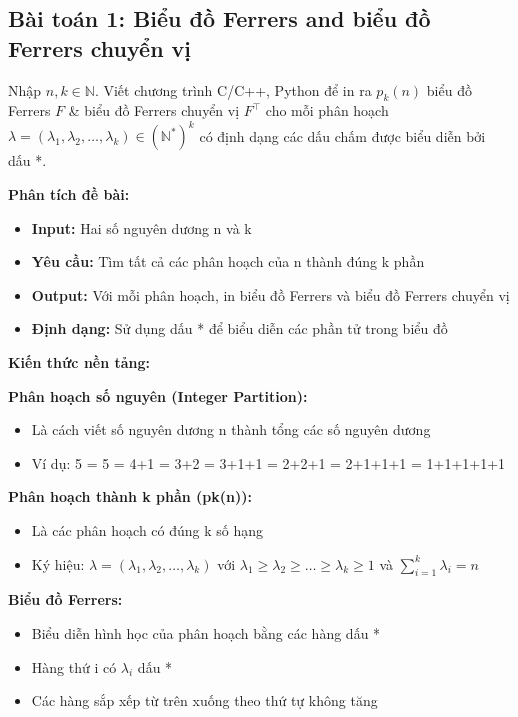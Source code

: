 \documentclass[12pt,a4paper]{article}
\begin{document}
\subsection{Bài toán 1: Biểu đồ Ferrers and biểu đồ Ferrers chuyển vị}

\begin{problembox}
Nhập $n, k \in \mathbb{N}$. Viết chương trình C/C++, Python để in ra $p_k(n)$ biểu đồ Ferrers $F$ \& biểu đồ Ferrers chuyển vị $F^\top$ cho mỗi phân hoạch $\lambda = (\lambda_1, \lambda_2, \ldots, \lambda_k) \in (\mathbb{N}^*)^k$ có định dạng các dấu chấm được biểu diễn bởi dấu *.

\end{problembox}

\textbf{Phân tích đề bài:}


\begin{itemize}[label=\textbullet]
    \item \textbf{Input:} Hai số nguyên dương n và k
    \item \textbf{Yêu cầu:} Tìm tất cả các phân hoạch của n thành đúng k phần
    \item \textbf{Output:} Với mỗi phân hoạch, in biểu đồ Ferrers và biểu đồ Ferrers chuyển vị
    \item \textbf{Định dạng:} Sử dụng dấu * để biểu diễn các phần tử trong biểu đồ
\end{itemize}

\textbf{Kiến thức nền tảng:}
\vspace{0.2cm}

\textbf{Phân hoạch số nguyên (Integer Partition):} 
\begin{itemize}[label=\textbullet]
    \item Là cách viết số nguyên dương n thành tổng các số nguyên dương
    \item Ví dụ: 5 = 5 = 4+1 = 3+2 = 3+1+1 = 2+2+1 = 2+1+1+1 = 1+1+1+1+1
\end{itemize}


\textbf{Phân hoạch thành k phần (pk(n)):} 
\begin{itemize}[label=\textbullet]
    \item Là các phân hoạch có đúng k số hạng
    \item Ký hiệu: $\lambda = (\lambda_1, \lambda_2, \ldots, \lambda_k)$ với $\lambda_1 \geq \lambda_2 \geq \ldots \geq \lambda_k \geq 1$ và $\sum_{i=1}^{k} \lambda_i = n$
\end{itemize}

\textbf{Biểu đồ Ferrers:} 
\begin{itemize}[label=\textbullet]
    \item Biểu diễn hình học của phân hoạch bằng các hàng dấu *
    \item Hàng thứ i có $\lambda_i$ dấu *
    \item Các hàng sắp xếp từ trên xuống theo thứ tự không tăng
\end{itemize}
\end{document}
